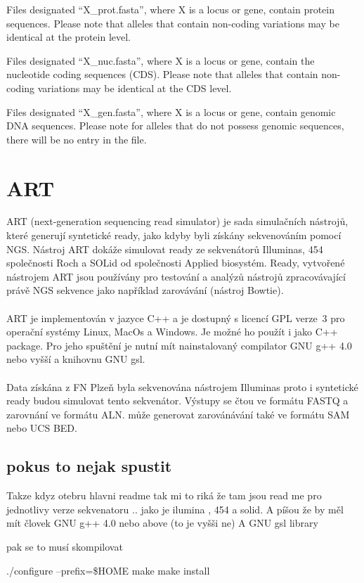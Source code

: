 \documentclass[czech,DP]{thesiskiv}
\begin{document}
Files designated “X\_prot.fasta”, where X is a locus or gene, contain protein sequences. Please note that alleles that contain non-coding variations may be identical at the protein level. 

Files designated “X\_nuc.fasta”, where X is a locus or gene, contain the nucleotide coding sequences (CDS). Please note that alleles that contain non-coding variations may be identical at the CDS level.

Files designated “X\_gen.fasta”, where X is a locus or gene, contain genomic DNA sequences. Please note for alleles that do not possess genomic sequences, there will be no entry in the file.

\section{ART}
ART (next-generation sequencing read simulator) je sada simulačních nástrojů, které generují syntetické ready, jako kdyby byli získány sekvenováním pomocí NGS. Nástroj ART dokáže simulovat ready ze sekvenátorů Illuminas, 454 společnosti Roch a SOLid od společnosti Applied biosystém. Ready, vytvořené nástrojem ART jsou používány pro testování a analýzů nástrojů zpracovávající právě NGS sekvence jako například zarovávání (nástroj Bowtie). 
\\
\\
ART je implementován v jazyce C++ a je dostupný s licencí GPL verze~3 pro operační systémy Linux, MacOs a Windows. Je možné ho použít i jako C++ package. Pro jeho spuštění je nutní mít nainstalovaný compilator GNU g++ 4.0 nebo vyšší a knihovnu GNU gsl. 
\\
\\
Data získána z FN Plzeň byla sekvenována nástrojem Illuminas proto i syntetické ready budou simulovat tento sekvenátor.    
 Výstupy se čtou ve formátu FASTQ a zarovnání ve formátu ALN. může generovat zarovánávání také ve formátu SAM nebo UCS BED. \cite{art}

\subsection{pokus to nejak spustit}
Takze kdyz otebru hlavni readme tak mi to riká že tam jsou read me pro jednotlivy verze sekvenatoru .. jako je ilumina , 454 a solid.
A píšou že by měl mít človek GNU g++ 4.0 nebo above (to je vyšši ne)
A GNU gsl library

pak se to musí skompilovat 

./configure --prefix=\$HOME
	       	make
	       	make install	 
	 
\end{document}
